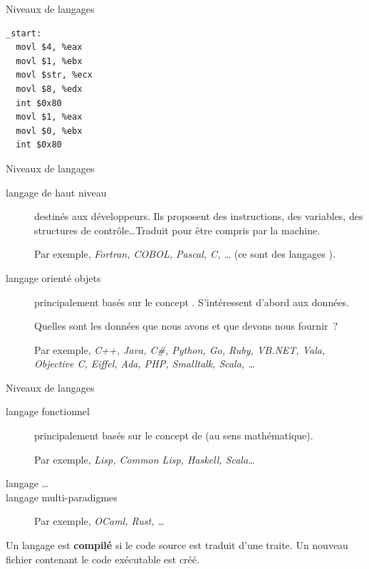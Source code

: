 \begin{hideedit}
\begin{frame}[fragile]{Niveaux de langages}
\begin{description}
{\begin{verbatim}
_start:
  movl $4, %eax
  movl $1, %ebx
  movl $str, %ecx
  movl $8, %edx
  int $0x80
  movl $1, %eax
  movl $0, %ebx
  int $0x80
\end{verbatim}
}
  \end{description}
\end{frame}
\begin{frame}[fragile]{Niveaux de langages}
  \begin{description}
    \item[langage de haut niveau]
      destinés aux développeurs. Ils proposent des instructions, des variables,
      des structures de contrôle\dots Traduit pour être compris par la machine.

      Par exemple, \textit{Fortran, COBOL, Pascal, C, \dots} (ce sont des
      langages ).

    \item[langage orienté objets]
      principalement basés sur le concept . S'intéressent
      d'abord aux données.

      Quelles sont les données que nous avons et que devons nous fournir~?

      Par exemple, {\it C++, Java, C\#, Python, Go, Ruby, VB.NET, Vala,}
      \textit{Objective C, Eiffel, Ada, PHP, Smalltalk, Scala, \dots}
  \end{description}
\end{frame}
\begin{frame}[fragile]{Niveaux de langages}
  \begin{description}
    \item[langage fonctionnel]
      principalement basés sur le concept de  (au sens
      mathématique).

      Par exemple, \textit{Lisp, Common Lisp, Haskell, Scala\dots}

    \item[langage \dots]

    \item[langage multi-paradigmes]
      Par exemple, \textit{OCaml, Rust, \dots}
  \end{description}
\end{frame}

\begin{frame}
  \begin{definition}
    Un langage est \textbf{compilé} si le code source est traduit d'une
    traite. Un nouveau fichier contenant le code exécutable est créé.
  \end{definition}


\end{frame}
\end{hideedit}

